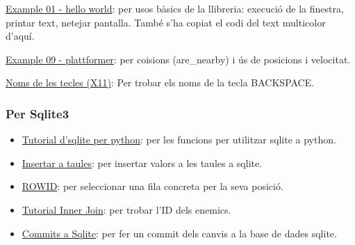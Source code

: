 \begin{itemize}
\begin{item}
\href{https://raw.githubusercontent.com/kitao/pyxel/main/python/pyxel/examples/01_hello_pyxel.py}
{Example 01 - hello world}:
per usos b\`asics de la llibreria:
execuci\'o de la finestra, printar text, netejar pantalla.
Tamb\'e s'ha copiat el codi del text multicolor d'aqu\'i.
\end{item}

\begin{item}
\href{https://raw.githubusercontent.com/kitao/pyxel/main/python/pyxel/examples/10_platformer.py}
{Example 09 - plattformer}:
per co\lgem isions (are\_nearby) i \'us de posicions i velocitat.
\end{item}

\begin{item}
\href{http://xahlee.info/linux/linux_show_keycode_keysym.html}
{Noms de les tecles (X11)}:
Per trobar els noms de la tecla BACKSPACE.
\end{item}
\end{itemize}



\subsubsection*{Per Sqlite3}
\begin{itemize}
\item{\href{https://pynative.com/python-sqlite/}
{Tutorial d'sqlite per python}}:
per les funcions per utilitzar sqlite a python.

\item{\href{https://www.sqlite.org/lang_insert.html}
{Insertar a taules}}:
per insertar valors a les taules a sqlite.

\item{\href{https://sqlite.org/rowidtable.html}
{ROWID}}:
per seleccionar una fila concreta per la seva posici\'o.

\item{\href{https://www.sqlitetutorial.net/sqlite-inner-join/}
{Tutorial Inner Join}}:
per trobar l'ID dels enemics.

\item{\href{https://stackoverflow.com/questions/26691504/python-sqlite3-data-is-not-saved-permanently}
{Commits a Sqlite}}:
per fer un commit dels canvis a la base de dades sqlite.
\end{itemize}

